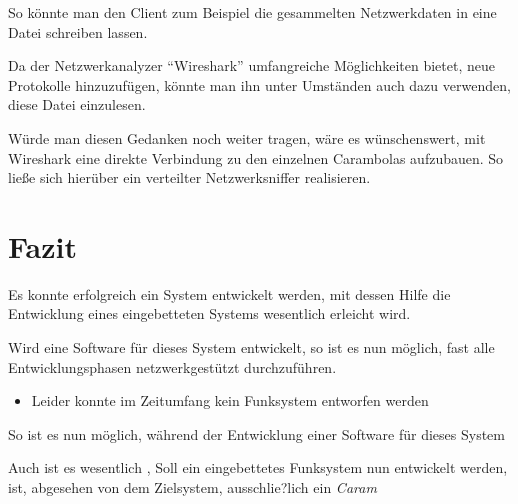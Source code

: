 So könnte man den Client zum Beispiel die gesammelten Netzwerkdaten in eine
Datei schreiben lassen.

Da der Netzwerkanalyzer "`Wireshark"'\cite{WIRESH} umfangreiche Möglichkeiten
bietet, neue Protokolle hinzuzufügen, könnte man ihn unter Umständen auch dazu
verwenden, diese Datei einzulesen.

Würde man diesen Gedanken noch weiter tragen, wäre es wünschenswert, mit
Wireshark eine direkte Verbindung zu den einzelnen Carambolas aufzubauen. So
ließe sich hierüber ein verteilter Netzwerksniffer realisieren.
\section{Fazit}
Es konnte erfolgreich ein System entwickelt werden, mit dessen Hilfe die
Entwicklung eines eingebetteten Systems wesentlich erleicht wird.

Wird eine Software für dieses System entwickelt, so ist es nun möglich, fast
alle Entwicklungsphasen netzwerkgestützt durchzuführen.

\begin{itemize}
  \item Leider konnte im Zeitumfang kein Funksystem entworfen werden
\end{itemize}


So ist es nun möglich, während der Entwicklung einer Software für dieses System 

Auch ist es wesentlich 
, Soll ein eingebettetes Funksystem nun entwickelt werden, ist, abgesehen von dem
Zielsystem, ausschlie?lich ein \emph{Caram}
